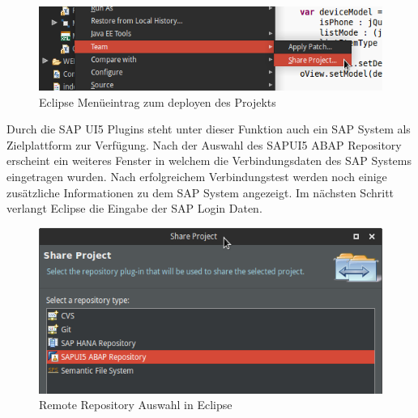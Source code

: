 \vspace{1em}
\begin{figure}[htb]
  \centering
  \includegraphics[width=0.8\linewidth]{abb/eclipse_share_project}
  \caption[Eclipse Menüeintrag zum deployen des Projekts]{Eclipse Menüeintrag zum deployen des Projekts}
  \label{fig:eclipseshare}
\end{figure}

Durch die SAP UI5 Plugins steht unter dieser Funktion auch ein SAP System als Zielplattform zur Verfügung. Nach der Auswahl des SAPUI5 ABAP Repository erscheint ein weiteres Fenster in welchem die Verbindungsdaten des SAP Systems eingetragen wurden. Nach erfolgreichem Verbindungstest werden noch einige zusätzliche Informationen zu dem SAP System angezeigt. Im nächsten Schritt verlangt Eclipse die Eingabe der SAP Login Daten.

\vspace{1em}
\begin{figure}[htb]
  \centering
  \includegraphics[width=0.8\linewidth]{abb/eclipse_share_project_window}
  \caption[Remote Repository Auswahl in Eclipse]{Remote Repository Auswahl in Eclipse}
  \label{fig:eclipsesharewindow}
\end{figure}

